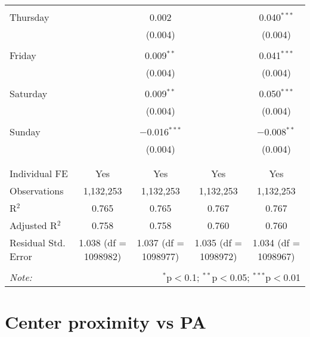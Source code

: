 \documentclass[
]{article}
\begin{document}
\begin{table}[!htbp]
{\begin{tabular}{@{\extracolsep{5pt}}lcccc}
  & & & & \\ 
 Thursday &  & 0.002 &  & 0.040$^{***}$ \\ 
  &  & (0.004) &  & (0.004) \\ 
  & & & & \\ 
 Friday &  & 0.009$^{**}$ &  & 0.041$^{***}$ \\ 
  &  & (0.004) &  & (0.004) \\ 
  & & & & \\ 
 Saturday &  & 0.009$^{**}$ &  & 0.050$^{***}$ \\ 
  &  & (0.004) &  & (0.004) \\ 
  & & & & \\ 
 Sunday &  & $-$0.016$^{***}$ &  & $-$0.008$^{**}$ \\ 
  &  & (0.004) &  & (0.004) \\ 
  & & & & \\ 
\hline \\[-1.8ex] 
Individual FE & Yes & Yes & Yes & Yes \\ 
Observations & 1,132,253 & 1,132,253 & 1,132,253 & 1,132,253 \\ 
R$^{2}$ & 0.765 & 0.765 & 0.767 & 0.767 \\ 
Adjusted R$^{2}$ & 0.758 & 0.758 & 0.760 & 0.760 \\ 
Residual Std. Error & 1.038 (df = 1098982) & 1.037 (df = 1098977) & 1.035 (df = 1098972) & 1.034 (df = 1098967) \\ 
\hline 
\hline \\[-1.8ex] 
\textit{Note:}  & \multicolumn{4}{r}{$^{*}$p$<$0.1; $^{**}$p$<$0.05; $^{***}$p$<$0.01} \\ 
\end{tabular}
} 
\end{table} 
\newpage
\section{Center proximity vs PA}
\end{document}
